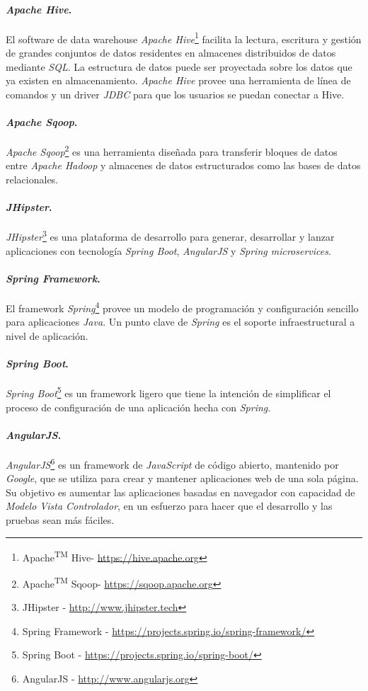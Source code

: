 \paragraph*{\textit{Apache Hive}.} El software de data warehouse \textit{Apache Hive}\footnote{Apache\textsuperscript{TM} Hive\textregistered - \url{https://hive.apache.org}} facilita la lectura, escritura y gestión de grandes conjuntos de datos residentes en almacenes distribuidos de datos mediante \textit{SQL}. La estructura de datos puede ser proyectada sobre los datos que ya existen en almacenamiento. \textit{Apache Hive} provee una herramienta de línea de comandos y un driver \textit{JDBC} para que los usuarios se puedan conectar a Hive. 
\paragraph*{ \textit{Apache Sqoop}.} \textit{Apache Sqoop}\footnote{Apache\textsuperscript{TM} Sqoop\textregistered - \url{https://sqoop.apache.org}} es una herramienta diseñada para transferir bloques de datos entre \textit{Apache Hadoop} y almacenes de datos estructurados como las bases de datos relacionales.
\paragraph*{\textit{JHipster}.} \textit{JHipster}\footnote{JHipster - \url{http://www.jhipster.tech}} es una plataforma de desarrollo para generar, desarrollar y lanzar aplicaciones con tecnología \textit{Spring Boot}, \textit{AngularJS} y \textit{Spring microservices}. 
\paragraph*{\textit{Spring Framework}.} El framework \textit{Spring}\footnote{Spring Framework - \url{https://projects.spring.io/spring-framework/}} provee un modelo de programación y configuración sencillo para aplicaciones \textit{Java}. Un punto clave de \textit{Spring} es el soporte infraestructural a nivel de aplicación. 
\paragraph*{\textit{Spring Boot}.} \textit{Spring Boot}\footnote{Spring Boot - \url{https://projects.spring.io/spring-boot/}} es un framework ligero que tiene la intención de simplificar el proceso de configuración de una aplicación hecha con \textit{Spring}. 
\paragraph*{\textit{AngularJS}.} \textit{AngularJS}\footnote{AngularJS - \url{http://www.angularjs.org}} es un framework de \textit{JavaScript} de código abierto, mantenido por \textit{Google}, que se utiliza para crear y mantener aplicaciones web de una sola página. Su objetivo es aumentar las aplicaciones basadas en navegador con capacidad de \textit{Modelo Vista Controlador}, en un esfuerzo para hacer que el desarrollo y las pruebas sean más fáciles.
